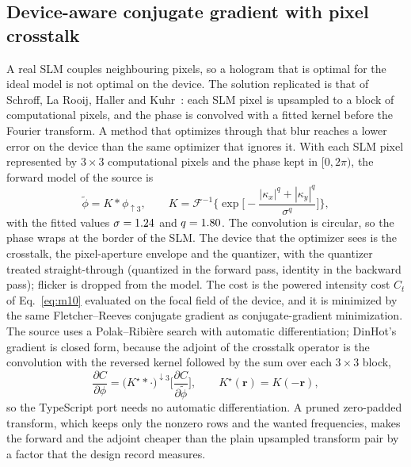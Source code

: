 
\subsection{Device-aware conjugate gradient with pixel crosstalk}\label{sec:m13}

A real SLM couples neighbouring pixels, so a hologram that is optimal for the ideal model is not optimal on the device. The solution replicated is that of Schroff, La Rooij, Haller and Kuhr~\cite{schroff}: each SLM pixel is upsampled to a block of computational pixels, and the phase is convolved with a fitted kernel before the Fourier transform. A method that optimizes through that blur reaches a lower error on the device than the same optimizer that ignores it. With each SLM pixel represented by $3\times3$ computational pixels and the phase kept in $[0,2\pi)$, the forward model of the source is
\begin{equation}
\tilde\phi=K*\phi_{\uparrow3},\qquad
K=\mathcal F^{-1}\Big\{\exp\Big[-\frac{|\kappa_x|^q+|\kappa_y|^q}{\sigma^q}\Big]\Big\},
\label{eq:m13}
\end{equation}
with the fitted values $\sigma=1.24$ and $q=1.80$. The convolution is circular, so the phase wraps at the border of the SLM. The device that the optimizer sees is the crosstalk, the pixel-aperture envelope and the quantizer, with the quantizer treated straight-through (quantized in the forward pass, identity in the backward pass); flicker is dropped from the model. The cost is the powered intensity cost $C_t$ of Eq.~\eqref{eq:m10} evaluated on the focal field of the device, and it is minimized by the same Fletcher--Reeves conjugate gradient as conjugate-gradient minimization. The source uses a Polak--Ribi\`ere search with automatic differentiation; DinHot's gradient is closed form, because the adjoint of the crosstalk operator is the convolution with the reversed kernel followed by the sum over each $3\times3$ block,
\begin{equation}
\frac{\partial C}{\partial\phi}=\big(K^{\star}*\cdot\big)^{\downarrow3}\Big[\frac{\partial C}{\partial\tilde\phi}\Big],\qquad K^{\star}(\mathbf r)=K(-\mathbf r),
\label{eq:m13-adjoint}
\end{equation}
so the TypeScript port needs no automatic differentiation. A pruned zero-padded transform, which keeps only the nonzero rows and the wanted frequencies, makes the forward and the adjoint cheaper than the plain upsampled transform pair by a factor that the design record measures.

